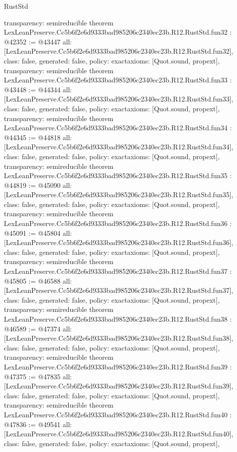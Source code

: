 \begin{lexlean}{RustStd}
\begin{coremodule}
{  transparency: semireducible
}
theorem LexLeanPreserve.Cc5b6f2e6d9333bad985206c2340ec23b.R12.RustStd.fun32 : @42352 := @43447 {
  all: [LexLeanPreserve.Cc5b6f2e6d9333bad985206c2340ec23b.R12.RustStd.fun32],
  class: false,
  generated: false,
  policy: exact{axioms: [Quot.sound, propext]},
  transparency: semireducible
}
theorem LexLeanPreserve.Cc5b6f2e6d9333bad985206c2340ec23b.R12.RustStd.fun33 : @43448 := @44344 {
  all: [LexLeanPreserve.Cc5b6f2e6d9333bad985206c2340ec23b.R12.RustStd.fun33],
  class: false,
  generated: false,
  policy: exact{axioms: [Quot.sound, propext]},
  transparency: semireducible
}
theorem LexLeanPreserve.Cc5b6f2e6d9333bad985206c2340ec23b.R12.RustStd.fun34 : @44345 := @44818 {
  all: [LexLeanPreserve.Cc5b6f2e6d9333bad985206c2340ec23b.R12.RustStd.fun34],
  class: false,
  generated: false,
  policy: exact{axioms: [Quot.sound, propext]},
  transparency: semireducible
}
theorem LexLeanPreserve.Cc5b6f2e6d9333bad985206c2340ec23b.R12.RustStd.fun35 : @44819 := @45090 {
  all: [LexLeanPreserve.Cc5b6f2e6d9333bad985206c2340ec23b.R12.RustStd.fun35],
  class: false,
  generated: false,
  policy: exact{axioms: [Quot.sound, propext]},
  transparency: semireducible
}
theorem LexLeanPreserve.Cc5b6f2e6d9333bad985206c2340ec23b.R12.RustStd.fun36 : @45091 := @45804 {
  all: [LexLeanPreserve.Cc5b6f2e6d9333bad985206c2340ec23b.R12.RustStd.fun36],
  class: false,
  generated: false,
  policy: exact{axioms: [Quot.sound, propext]},
  transparency: semireducible
}
theorem LexLeanPreserve.Cc5b6f2e6d9333bad985206c2340ec23b.R12.RustStd.fun37 : @45805 := @46588 {
  all: [LexLeanPreserve.Cc5b6f2e6d9333bad985206c2340ec23b.R12.RustStd.fun37],
  class: false,
  generated: false,
  policy: exact{axioms: [Quot.sound, propext]},
  transparency: semireducible
}
theorem LexLeanPreserve.Cc5b6f2e6d9333bad985206c2340ec23b.R12.RustStd.fun38 : @46589 := @47374 {
  all: [LexLeanPreserve.Cc5b6f2e6d9333bad985206c2340ec23b.R12.RustStd.fun38],
  class: false,
  generated: false,
  policy: exact{axioms: [Quot.sound, propext]},
  transparency: semireducible
}
theorem LexLeanPreserve.Cc5b6f2e6d9333bad985206c2340ec23b.R12.RustStd.fun39 : @47375 := @47835 {
  all: [LexLeanPreserve.Cc5b6f2e6d9333bad985206c2340ec23b.R12.RustStd.fun39],
  class: false,
  generated: false,
  policy: exact{axioms: [Quot.sound, propext]},
  transparency: semireducible
}
theorem LexLeanPreserve.Cc5b6f2e6d9333bad985206c2340ec23b.R12.RustStd.fun40 : @47836 := @49541 {
  all: [LexLeanPreserve.Cc5b6f2e6d9333bad985206c2340ec23b.R12.RustStd.fun40],
  class: false,
  generated: false,
  policy: exact{axioms: [Quot.sound, propext]},
}
\end{coremodule}
\end{lexlean}
